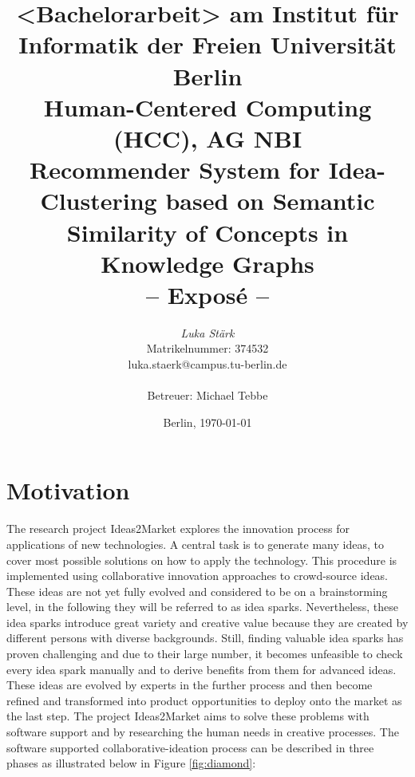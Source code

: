 \documentclass[pdftex,a4paper,12pt]{scrartcl}
\title{
{\small <Bachelorarbeit> am Institut für Informatik der Freien Universität Berlin}\\
{\small Human-Centered Computing (HCC), AG NBI}\\
[6ex]
{\LARGE Recommender System for Idea-Clustering based on Semantic Similarity of Concepts in Knowledge Graphs }\\
{\normalsize-- Exposé --}}
\author{
{\emph{\normalsize Luka Stärk}}\\
{\normalsize Matrikelnummer: 374532}\\
{\normalsize luka.staerk@campus.tu-berlin.de}\\\\
{\normalsize Betreuer: Michael Tebbe}
}
\date{\normalsize Berlin, \today}
\theoremstyle{definition}
\newcommand{\blankpage}{
\newpage
\thispagestyle{empty}
\mbox{}
\newpage
}
\begin{document}
\maketitle 



\thispagestyle{empty}  %
\blankpage

\setcounter{page}{1} %


\section{Motivation} 
    
The research project Ideas2Market explores the innovation process for applications of new technologies. A central task is to generate many ideas, to cover most possible solutions on how to apply the technology. This procedure is implemented using collaborative innovation approaches to crowd-source ideas. These ideas are not yet fully evolved and considered to be on a brainstorming level, in the following they will be referred to as idea sparks. Nevertheless, these idea sparks introduce great variety and creative value because they are created by different persons with diverse backgrounds. Still, finding valuable idea sparks has proven challenging and due to their large number, it becomes unfeasible to check every idea spark manually and to derive benefits from them for advanced ideas. These ideas are evolved by experts in the further process and then become refined and transformed into product opportunities to deploy onto the market as the last step. The project Ideas2Market aims to solve these problems with software support and by researching the human needs in creative processes. The software supported collaborative-ideation process can be described in three phases as illustrated below in Figure \ref{fig:diamond}:
\end{document}
